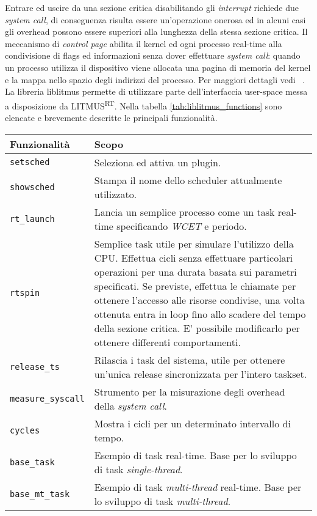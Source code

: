 \begin{appendices}
\noindent Entrare ed uscire da una sezione critica disabilitando gli \textit{interrupt} richiede due \textit{system call}, di conseguenza risulta essere un'operazione onerosa ed in alcuni casi gli overhead possono essere superiori alla lunghezza della stessa sezione critica. Il meccanismo di \textit{control page} abilita il kernel ed ogni processo real-time alla condivisione di flags ed informazioni senza dover effettuare \textit{system call}: quando un processo utilizza il dispositivo viene allocata una pagina di memoria del kernel e la mappa nello spazio degli indirizzi del processo. Per maggiori dettagli vedi ~\cite{BBBThesis}.\\

\noindent La libreria liblitmus permette di utilizzare parte dell'interfaccia user-space messa a disposizione da LITMUS\textsuperscript{RT}. Nella tabella \ref{tab:liblitmus_functions} sono elencate e brevemente descritte le principali funzionalità.\\

\begin{table}
  \centering
  \begin{tabular}{|l p{10cm}|}
	\hline
	    Funzionalità & Scopo \\
	\hline \hline
	   
\texttt{setsched}			& Seleziona ed attiva un plugin. \\
\texttt{showsched}			& Stampa il nome dello scheduler attualmente utilizzato. \\
\texttt{rt\_launch}			& Lancia un semplice processo come un task real-time specificando \textit{WCET} e periodo. \\
\texttt{rtspin}				& Semplice task utile per simulare l'utilizzo della CPU. Effettua cicli senza effettuare particolari operazioni per una durata basata sui parametri specificati. Se previste, effettua le chiamate per ottenere l'accesso alle risorse condivise, una volta ottenuta entra in loop fino allo scadere del tempo della sezione critica. E' possibile modificarlo per ottenere differenti comportamenti. \\
\texttt{release\_ts}		& Rilascia i task del sistema, utile per ottenere un'unica release sincronizzata per l'intero taskset.\\
\texttt{measure\_syscall}	& Strumento per la misurazione degli overhead della \textit{system call}.\\
\texttt{cycles}				& Mostra i cicli per un determinato intervallo di tempo. \\
\texttt{base\_task}			& Esempio di task real-time. Base per lo sviluppo di task \textit{single-thread}. \\
\texttt{base\_mt\_task}		& Esempio di task \textit{multi-thread} real-time. Base per lo sviluppo di task \textit{multi-thread}. \\


\end{tabular}
\end{table}
\end{appendices}
